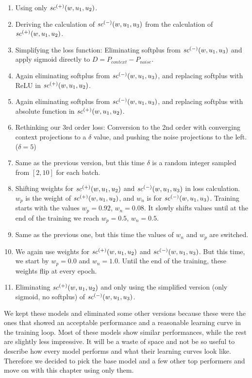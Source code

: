 \begin{enumerate}
    \item Using only $\mathit{sc}^{({+})}({w, u_1, u_2})$.
    \item Deriving the calculation of $\mathit{sc}^{({-})}({w, u_1, u_3})$ from the calculation of $\mathit{sc}^{({+})}({w, u_1, u_2})$.
    \item Simplifying the loss function: Eliminating softplus from $\mathit{sc}^{({-})}({w, u_1, u_3})$ and apply sigmoid directly to $D = P_\mathit{context} - P_\mathit{noise}$.
    \item Again eliminating softplus from $\mathit{sc}^{({-})}({w, u_1, u_3})$, and replacing softplus with \ac{ReLU} in $\mathit{sc}^{({+})}({w, u_1, u_2})$.
    \item Again eliminating softplus from $\mathit{sc}^{({-})}({w, u_1, u_3})$, and replacing softplus with absolute function in $\mathit{sc}^{({+})}({w, u_1, u_2})$.
    \item Rethinking our 3rd order loss: Conversion to the 2nd order with converging context projections to a $\delta$ value, and pushing the noise projections to the left. ($\delta = 5$)
    \item Same as the previous version, but this time $\delta$ is a random integer sampled from $[2,10]$ for each batch.
    \item Shifting weights for $\mathit{sc}^{({+})}({w, u_1, u_2})$ and $\mathit{sc}^{({-})}({w, u_1, u_3})$ in loss calculation. $w_p$ is the weight of $\mathit{sc}^{({+})}({w, u_1, u_2})$, and $w_n$ is for $\mathit{sc}^{({-})}({w, u_1, u_3})$. Training starts with the values $w_p = 0.92$, $w_n = 0.08$. It slowly shifts values until at the end of the training we reach $w_p = 0.5$, $w_n = 0.5$.
    \item Same as the previous one, but this time the values of $w_n$ and $w_p$ are switched.
    \item We again use weights for $\mathit{sc}^{({+})}({w, u_1, u_2})$ and $\mathit{sc}^{({-})}({w, u_1, u_3})$. But this time, we start by $w_p = 0.0$ and $w_n = 1.0$. Until the end of the training, these weights flip at every epoch.
    \item Eliminating $\mathit{sc}^{({+})}({w, u_1, u_2})$ and only using the simplified version (only sigmoid, no softplus) of $\mathit{sc}^{({-})}({w, u_1, u_3})$.
\end{enumerate}

We kept these models and eliminated some other versions because these were the ones that showed an acceptable performance and a reasonable learning curve in the training loop. Most of these models show similar performances, while the rest are slightly less impressive. It will be a waste of space and not be so useful to describe how every model performs and what their learning curves look like. Therefore we decided to pick the base model and a few other top performers and move on with this chapter using only them.


